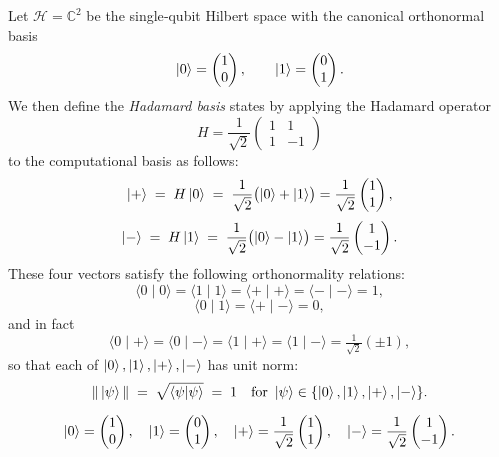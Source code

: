 \begin{definition}
	Let $\mathcal H=\mathbb C^2$ be the single‐qubit Hilbert space with the canonical orthonormal basis
	\[
	\ket{0}=\begin{pmatrix}1\\0\end{pmatrix},
	\qquad
	\ket{1}=\begin{pmatrix}0\\1\end{pmatrix}.
	\]
	We then define the \emph{Hadamard basis} states by applying the Hadamard operator
	\[
	H=\frac1{\sqrt2}\begin{pmatrix}1 & 1\\1 & -1\end{pmatrix}
	\]
	to the computational basis as follows:
	\[
	\ket{+}\;=\;H\ket{0}
	\;=\;\frac1{\sqrt2}\bigl(\ket{0}+\ket{1}\bigr)
	=\frac1{\sqrt2}\begin{pmatrix}1\\1\end{pmatrix},
	\]
	\[
	\ket{-}\;=\;H\ket{1}
	\;=\;\frac1{\sqrt2}\bigl(\ket{0}-\ket{1}\bigr)
	=\frac1{\sqrt2}\begin{pmatrix}1\\-1\end{pmatrix}.
	\]
	These four vectors satisfy the following orthonormality relations:
	\[
	\langle 0 \mid 0\rangle = \langle 1 \mid 1\rangle = \langle + \mid +\rangle = \langle - \mid -\rangle = 1,
	\]
	\[
	\langle 0 \mid 1\rangle = \langle + \mid -\rangle = 0,
	\]
	and in fact
	\[
	\langle 0 \mid +\rangle = \langle 0 \mid -\rangle = \langle 1 \mid +\rangle = \langle 1 \mid -\rangle = \tfrac1{\sqrt2}(\pm1),
	\]
	so that each of $\ket0,\ket1,\ket+,\ket-$ has unit norm:
	\[
	\|\ket\psi\| \;=\;\sqrt{\langle\psi|\psi\rangle} \;=\;1
	\quad
	\text{for }
	\ket\psi\in\{\ket0,\ket1,\ket+,\ket-\}.
	\]
\end{definition}
\[
\ket{0}=\begin{pmatrix}1\\0\end{pmatrix},\quad
\ket{1}=\begin{pmatrix}0\\1\end{pmatrix},\quad
\ket{+}=\frac1{\sqrt2}\begin{pmatrix}1\\1\end{pmatrix},\quad
\ket{-}=\frac1{\sqrt2}\begin{pmatrix}1\\-1\end{pmatrix}.
\]

